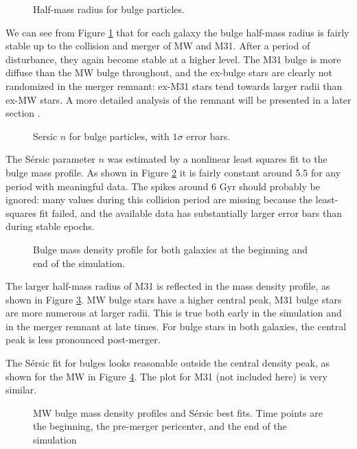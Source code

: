 \documentclass[twocolumn]{aastex63}
\newcommand{\todo}{\color{red}{TODO}\color{black}\hspace{2mm}}
\begin{document}
\begin{figure}[bht!]
	\caption{Half-mass radius for bulge particles.
		\label{fig:sersic_Re}}
\end{figure}

We can see from Figure \ref{fig:sersic_Re} that for each galaxy the bulge half-mass radius is fairly stable up to the collision and merger of MW and M31. After a period of disturbance, they again become stable at a higher level. The M31 bulge is more diffuse than the MW bulge throughout, and the ex-bulge stars are clearly not randomized in the merger remnant: ex-M31 stars tend towards larger radii than ex-MW stars. A more detailed analysis of the remnant will be presented in a later section \todo{crossref}.

\begin{figure}[bht!]
	\caption{Sersic $n$ for bulge particles, with $1\sigma$ error bars.
		\label{fig:sersic_n}}
\end{figure}

The Sérsic parameter $n$ was estimated by a nonlinear least squares fit to the bulge mass profile. As shown in Figure \ref{fig:sersic_n} it is fairly constant around 5.5 for any period with meaningful data. The spikes around 6 Gyr should probably be ignored: many values during this collision period are missing because the least-squares fit failed, and the available data has substantially larger error bars than during stable epochs.

\begin{figure}[bht!]
	\caption{Bulge mass density profile for both galaxies at the beginning and end of the simulation.
		\label{fig:bulge_mp}}
\end{figure}

The larger half-mass radius of M31 is reflected in the mass density profile, as shown in Figure \ref{fig:bulge_mp}. MW bulge stars have a higher central peak, M31 bulge stars are more numerous at larger radii. This is true both early in the simulation and in the merger remnant at late times. For bulge stars in both galaxies, the central peak is less pronounced post-merger.

The Sérsic fit for bulges looks reasonable outside the central density peak, as shown for the MW in Figure \ref{fig:MW_bulge_sersic}. The plot for M31 (not included here) is very  similar.

\begin{figure}[bht!]
	\caption{MW bulge mass density profiles and Sérsic best fits. Time points are the beginning, the pre-merger pericenter, and the end of the simulation
		\label{fig:MW_bulge_sersic}}
\end{figure}
\end{document}
